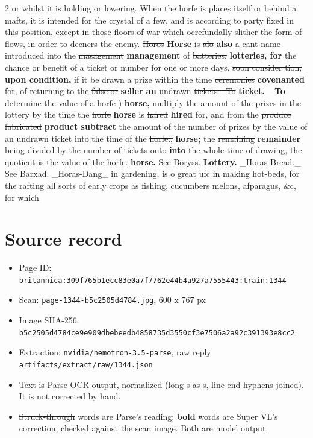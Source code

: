 \documentclass[10pt]{article}
\begin{document}
\begin{multicols}{2}
or whilst it is holding or lowering. When the horfe is places itself or behind a mafts, it is intended for the crystal of a few, and is according to party fixed in this position, except in those floors of war which ocrefundally slither the form of flows, in order to decners the enemy. \sout{Horos} \textbf{Horse} is \sout{alo} \textbf{also} a cant name introduced into the \sout{masagement} \textbf{management} of \sout{batteries,} \textbf{lotteries, for} the chance or benefit of a ticket or number for one or more days, \sout{soon consider tion,} \textbf{upon condition,} if it be drawn a prize within the time \sout{ceremonies} \textbf{covenanted} for, of returning to the \sout{false or} \textbf{seller an} undrawn \sout{tickets—To} \textbf{ticket.—To} determine the value of a \sout{horfe )} \textbf{horse,} multiply the amount of the prizes in the lottery by the time the \sout{horfe} \textbf{horse} is \sout{hared} \textbf{hired} for, and from the \sout{produce fabricated} \textbf{product subtract} the amount of the number of prizes by the value of an undrawn ticket into the time of the \sout{horfe.,} \textbf{horse;} the \sout{remaining} \textbf{remainder} being divided by the number of tickets \sout{onto} \textbf{into} the whole time of drawing, the quotient is the value of the \sout{horfe.} \textbf{horse.} See \sout{Boryss.} \textbf{Lottery.} \_Horas-Bread.\_ See Barxad. \_Horas-Dang\_ in gardening, is o great ufc in making hot-beds, for the rafting all sorts of early crops as fishing, cucumbers melons, afparagus, \&c, for which
\end{multicols}
\section*{Source record}
\begin{itemize}
\item Page ID: \texttt{britannica:309f765b1ecc83e0a7f7762e44b4a927a7555443:train:1344}
\item Scan: \texttt{page-1344-b5c2505d4784.jpg}, 600 x 767 px
\item Image SHA-256: \texttt{\small b5c2505d4784ce9e909dbebeedb4858735d3550cf3e7506a2a92c391393e8cc2}
\item Extraction: \texttt{nvidia/nemotron-3.5-parse}, raw reply \texttt{artifacts/extract/raw/1344.json}
\item Text is Parse OCR output, normalized (long s as s, line-end hyphens joined). It is not corrected by hand.
\item \sout{Struck-through} words are Parse's reading; \textbf{bold} words are Super VL's correction, checked against the scan image. Both are model output.
\end{itemize}
\end{document}
